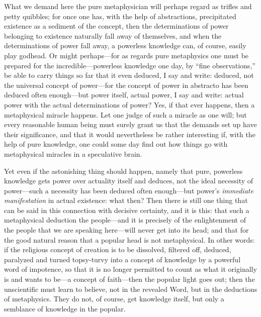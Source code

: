 \documentclass[12pt]{book}
\newcommand{\opage}[1]{\marginnote{\footnotesize\textit{[#1]}}}
\begin{document}
What we demand here the pure metaphysician will perhaps regard as
trifles and petty quibbles; for once one has, with the help of
abstractions, precipitated existence as a sediment of the concept, then
the determinations of power belonging to existence naturally fall away
of themselves, and when the determinations of power fall away, a
powerless knowledge can, of course, easily play godhead. Or might
perhaps---for as regards pure metaphysics one must be prepared for the
incredible---powerless knowledge one day, by ``fine observations,'' be
able to carry things so far that it even deduced, I say and write:
deduced, not the universal concept of power---for the concept of power
in abstracto has been deduced often enough---but power itself, actual
power, I say and write: actual power with the actual determinations of
power? Yes, if that ever happens, then a metaphysical miracle happens.
Let one judge of such a miracle as one will; but every reasonable human
being must surely grant us that the demands set up have their
significance, and that it would nevertheless
\opage{145}\setcounter{footnote}{0}%
be rather interesting if, with the help of pure knowledge, one could
some day find out how things go with metaphysical miracles in a
speculative brain.

Yet even if the astonishing thing should happen, namely that pure,
powerless knowledge gets power over actuality itself and deduces, not
the ideal necessity of power---such a necessity has been deduced often
enough---but power's \textit{immediate manifestation} in actual
existence: what then? Then there is still one thing that can be said in
this connection with decisive certainty, and it is this: that such a
metaphysical deduction the people---and it is precisely of the
enlightenment of the people that we are speaking here---will never get
into its head; and that for the good natural reason that a popular head
is not metaphysical. In other words: if the religious concept of
creation is to be dissolved, filtered off, deduced, paralyzed and turned
topsy-turvy into a concept of knowledge by a powerful word of impotence,
so that it is no longer permitted to count as what it originally is and
wants to be---a concept of faith---then the popular light goes out; then
the unscientific must learn to believe, not in the revealed Word, but in
the deductions of metaphysics. They do not, of course, get knowledge
itself, but only a semblance of knowledge in the popular.
\end{document}
